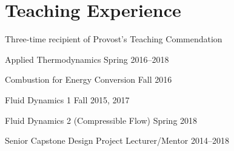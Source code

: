 \section{{\sectionfont Teaching Experience}}


\vspace{0.25\baselineskip}


Three-time recipient of Provost's Teaching Commendation
\begin{outerlist}
\item Applied Thermodynamics \hfill Spring 2016--2018
\item Combustion for Energy Conversion \hfill Fall 2016

\item Fluid Dynamics 1 \hfill Fall 2015, 2017

\item Fluid Dynamics 2 (Compressible Flow) \hfill Spring 2018

\item Senior Capstone Design Project Lecturer/Mentor \hfill 2014--2018


\end{outerlist}
